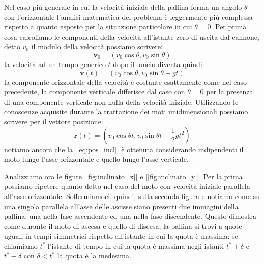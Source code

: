 \documentclass[a4paper,10pt,oneside]{article}
\begin{document}
Nel  caso più generale in cui la velocità iniziale della pallina forma un angolo $\theta$ con l'orizzontale l'analisi matematica del problema è leggermente più complessa rispetto a quanto esposto per la situazione particolare in cui $\theta=0$.
Per prima cosa calcoliamo le componenti della velocità all'istante zero di uscita dal cannone, detto $v_0$ il modulo della velocità possiamo scrivere:
\begin{equation}
 \mathbf{v}_0=(v_0\cos\theta,v_0\sin\theta)
\end{equation}
la velocità ad un tempo generico $t$ dopo il lancio diventa quindi:
\begin{equation}
 \mathbf{v}(t)=(v_0\cos\theta,v_0\sin\theta-gt)
\end{equation}
la componente orizzontale della velocità è costante esattamente come nel caso precedente, la componente verticale differisce dal caso con $\theta=0$ per la presenza di una componente verticale non nulla della velocità iniziale.
Utilizzando le conoscenze acquisite durante la trattazione dei moti unidimensionali possiamo scrivere per il vettore posizione:
\begin{equation}\label{eq:pos_incl}
 \mathbf{r}(t)=(v_0\cos\theta t,v_0\sin\theta t-\frac{1}{2}gt^2)
\end{equation}
notiamo ancora che la [\ref{eq:pos_incl}] è ottenuta considerando indipendenti il moto lungo l'asse orizzontale e quello lungo l'asse verticale.


Analizziamo ora le figure [\ref{fig:inclinato_x}] e [\ref{fig:inclinato_y}]. Per la prima possiamo ripetere quanto detto nel caso del moto con velocità iniziale parallela all'asse orizzontale. Soffermiamoci, quindi, sulla seconda figura e notiamo come su una singola parallela all'asse delle ascisse siano presenti due immagini della pallina: una nella fase ascendente ed una nella fase discendente. Questo dimostra come durante il moto di ascesa e quello di discesa, la pallina si trovi a quote uguali in tempi simmetrici rispetto all'istante in cui la quota è massima: se chiamiamo $t^*$ l'istante di tempo in cui la quota è massima negli istanti $t^*+\delta$ e $t^* -\delta$ con $\delta <t^*$ la quota è la medesima.
\end{document}
